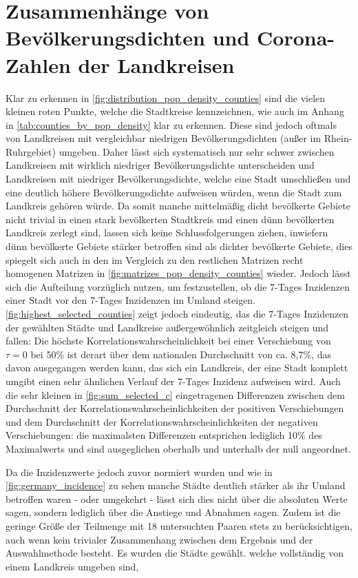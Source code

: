 \section{Zusammenhänge von Bevölkerungsdichten und Corona-Zahlen der Landkreisen}\label{sec:discussion:pop_density}
Klar zu erkennen in \autoref{fig:distribution_pop_density_counties} sind die vielen kleinen roten Punkte, welche die Stadtkreise kennzeichnen, wie auch im Anhang in \autoref{tab:counties_by_pop_density} klar zu erkennen.
Diese sind jedoch oftmals von Landkreisen mit vergleichbar niedrigen Bevölkerungsdichten (außer im Rhein-Ruhrgebiet) umgeben. Daher lässt sich systematisch nur sehr schwer zwischen Landkreisen mit wirklich niedriger Bevölkerungsdichte unterscheiden und Landkreisen mit niedriger Bevölkerungsdichte, welche eine Stadt umschließen und eine deutlich höhere Bevölkerungsdichte aufweisen würden, wenn die Stadt zum Landkreis gehören würde. Da somit manche mittelmäßig dicht bevölkerte Gebiete nicht trivial in einen stark bevölkerten Stadtkreis und einen dünn bevölkerten Landkreis zerlegt sind, lassen sich keine Schlussfolgerungen ziehen, inwiefern dünn bevölkerte Gebiete stärker betroffen sind als dichter bevölkerte Gebiete, dies spiegelt sich auch in den im Vergleich zu den restlichen Matrizen recht homogenen Matrizen in \autoref{fig:matrizes_pop_density_counties} wieder.
Jedoch lässt sich die Aufteilung vorzüglich nutzen, um festzustellen, ob die 7-Tages Inzidenzen einer Stadt vor den 7-Tages Inzidenzen im Umland steigen.
\autoref{fig:highest_selected_counties} zeigt jedoch eindeutig, das die 7-Tages Inzidenzen der gewählten Städte und Landkreise außergewöhnlich zeitgleich steigen und fallen: Die höchste Korrelationswahrscheinlichkeit bei einer Verschiebung von $\tau=0$ bei 50\% ist derart über dem nationalen Durchschnitt von ca. 8,7\%, das davon ausgegangen werden kann, das sich ein Landkreis, der eine Stadt komplett umgibt einen sehr ähnlichen Verlauf der 7-Tages Inzidenz aufweisen wird.
Auch die sehr kleinen in \autoref{fig:sum_selected_c} eingetragenen Differenzen zwischen dem Durchschnitt der Korrelationswahrscheinlichkeiten der positiven Verschiebungen und dem Durchschnitt der Korrelationswahrscheinlichkeiten der negativen Verschiebungen: die maximalsten Differenzen entsprichen lediglich 10\% des Maximalwerts und sind ausgeglichen oberhalb und unterhalb der null angeordnet.

Da die Inzidenzwerte jedoch zuvor normiert wurden und wie in \autoref{fig:germany_incidence} zu sehen manche Städte deutlich stärker als ihr Umland betroffen waren - oder umgekehrt - lässt sich dies nicht über die absoluten Werte sagen, sondern lediglich über die Anstiege und Abnahmen sagen.
Zudem ist die geringe Größe der Teilmenge mit 18 untersuchten Paaren stets zu berücksichtigen, auch wenn kein trivialer Zusammenhang zwischen dem Ergebnis und der Auswahlmethode besteht. Es wurden die Städte gewählt. welche vollständig von einem Landkreis umgeben sind,

